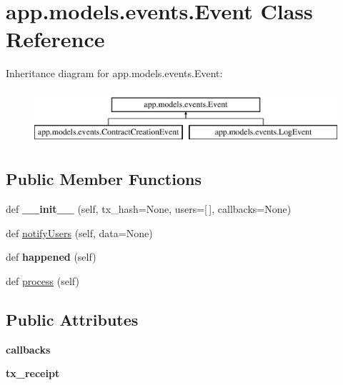 \hypertarget{classapp_1_1models_1_1events_1_1_event}{}\section{app.\+models.\+events.\+Event Class Reference}
\label{classapp_1_1models_1_1events_1_1_event}
Inheritance diagram for app.\+models.\+events.\+Event\+:\begin{figure}[H]
\begin{center}
\leavevmode
\includegraphics[height=2.000000cm]{classapp_1_1models_1_1events_1_1_event}
\end{center}
\end{figure}
\subsection*{Public Member Functions}
\begin{DoxyCompactItemize}
\item 
\mbox{\label{classapp_1_1models_1_1events_1_1_event_a4d555feff902c533a1a5e85e92bd6314}} 
def {\bfseries \+\_\+\+\_\+init\+\_\+\+\_\+} (self, tx\+\_\+hash=None, users=\mbox{[}$\,$\mbox{]}, callbacks=None)
\item 
def \hyperlink{classapp_1_1models_1_1events_1_1_event_a161c2351b3dad94eee41f1a6d467f895}{notify\+Users} (self, data=None)
\item 
\mbox{\label{classapp_1_1models_1_1events_1_1_event_a670ecc8f956c8dc433185a496209877a}} 
def {\bfseries happened} (self)
\item 
def \hyperlink{classapp_1_1models_1_1events_1_1_event_adc489dd02d1fe4e287d5c369a9f3a443}{process} (self)
\end{DoxyCompactItemize}
\subsection*{Public Attributes}
\begin{DoxyCompactItemize}
\item 
\mbox{\label{classapp_1_1models_1_1events_1_1_event_a6a14a224c3e70fd30695aa62763a5755}} 
{\bfseries callbacks}
\item 
\mbox{\label{classapp_1_1models_1_1events_1_1_event_a21079245805e91f49e18f628aad72ef3}} 
{\bfseries tx\+\_\+receipt}
\end{DoxyCompactItemize}
